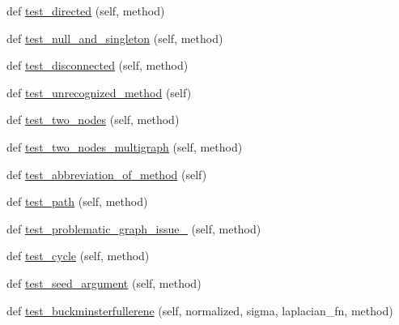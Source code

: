 \begin{DoxyCompactItemize}
\item 
def \hyperlink{classnetworkx_1_1linalg_1_1tests_1_1test__algebraic__connectivity_1_1TestAlgebraicConnectivity_acf001fce6aae0d9834c79133cf9204e2}{test\+\_\+directed} (self, method)
\item 
def \hyperlink{classnetworkx_1_1linalg_1_1tests_1_1test__algebraic__connectivity_1_1TestAlgebraicConnectivity_a8e1d7523c5af8b629d522a6e5c9b89c7}{test\+\_\+null\+\_\+and\+\_\+singleton} (self, method)
\item 
def \hyperlink{classnetworkx_1_1linalg_1_1tests_1_1test__algebraic__connectivity_1_1TestAlgebraicConnectivity_a6bc25ae032d17d5605ad266b40c846ed}{test\+\_\+disconnected} (self, method)
\item 
def \hyperlink{classnetworkx_1_1linalg_1_1tests_1_1test__algebraic__connectivity_1_1TestAlgebraicConnectivity_a3f010ed87b6646a84ad029c0da4c1626}{test\+\_\+unrecognized\+\_\+method} (self)
\item 
def \hyperlink{classnetworkx_1_1linalg_1_1tests_1_1test__algebraic__connectivity_1_1TestAlgebraicConnectivity_aec5e086c0e80b1d3f53e9cbab103e8cf}{test\+\_\+two\+\_\+nodes} (self, method)
\item 
def \hyperlink{classnetworkx_1_1linalg_1_1tests_1_1test__algebraic__connectivity_1_1TestAlgebraicConnectivity_a1f37876203370057fa99aad6dedee512}{test\+\_\+two\+\_\+nodes\+\_\+multigraph} (self, method)
\item 
def \hyperlink{classnetworkx_1_1linalg_1_1tests_1_1test__algebraic__connectivity_1_1TestAlgebraicConnectivity_a751d5240682fd04b6c2ae1d27b14ad7b}{test\+\_\+abbreviation\+\_\+of\+\_\+method} (self)
\item 
def \hyperlink{classnetworkx_1_1linalg_1_1tests_1_1test__algebraic__connectivity_1_1TestAlgebraicConnectivity_aa6bcdeadfa32f16596c91cc4f9f743dc}{test\+\_\+path} (self, method)
\item 
def \hyperlink{classnetworkx_1_1linalg_1_1tests_1_1test__algebraic__connectivity_1_1TestAlgebraicConnectivity_a182c32d873e53d932355fba63149f4b5}{test\+\_\+problematic\+\_\+graph\+\_\+issue\+\_} (self, method)
\item 
def \hyperlink{classnetworkx_1_1linalg_1_1tests_1_1test__algebraic__connectivity_1_1TestAlgebraicConnectivity_aed322fc8fdd527f61135e535988ecae4}{test\+\_\+cycle} (self, method)
\item 
def \hyperlink{classnetworkx_1_1linalg_1_1tests_1_1test__algebraic__connectivity_1_1TestAlgebraicConnectivity_a0b38a0f95bfbc37fe5926fe82084ccaf}{test\+\_\+seed\+\_\+argument} (self, method)
\item 
def \hyperlink{classnetworkx_1_1linalg_1_1tests_1_1test__algebraic__connectivity_1_1TestAlgebraicConnectivity_a45ca5492405a0116925b48fe23666917}{test\+\_\+buckminsterfullerene} (self, normalized, sigma, laplacian\+\_\+fn, method)
\end{DoxyCompactItemize}


